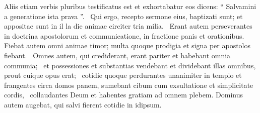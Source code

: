 \begin{biblechapter}
\begin{biblechapter}
 \verse Aliis etiam verbis pluribus testificatus est et exhortabatur eos dicens: “ Salvamini a generatione ista prava ”. 
 \verse Qui ergo, recepto sermone eius, baptizati sunt; et appositae sunt in il la die animae circiter tria milia. 
 \verse Erant autem perseverantes in doctrina apostolorum et communicatione, in fractione panis et orationibus. 
 \verse Fiebat autem omni animae timor; multa quoque prodigia et signa per apostolos fiebant. 
 \verse Omnes autem, qui crediderant, erant pariter et habebant omnia communia; 
 \verse et possessiones et substantias vendebant et dividebant illas omnibus, prout cuique opus erat; 
 \verse cotidie quoque perdurantes unanimiter in templo et frangentes circa domos panem, sumebant cibum cum exsultatione et simplicitate cordis, 
 \verse collaudantes Deum et habentes gratiam ad omnem plebem. Dominus autem augebat, qui salvi fierent cotidie in idipsum.
 

\end{biblechapter}
\end{biblechapter}
